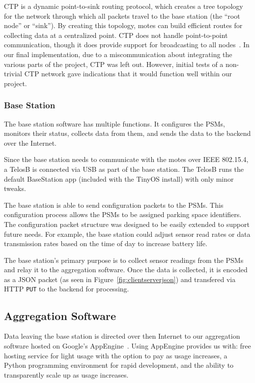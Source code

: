 \documentclass{acm_proc}
\begin{document}
CTP is a dynamic point-to-sink routing protocol, which creates a tree
topology for the network through which all packets travel to the base
station (the ``root node'' or ``sink'').
By creating this topology, motes can build efficient routes for collecting
data at a centralized point.
CTP does not handle point-to-point communication, though it does provide
support for broadcasting to all
nodes~\cite{tep123:collection-tree-protocol}.
In our final implementation, due to a miscommunication about integrating
the various parts of the project, CTP was left out.
However, initial tests of a non-trivial CTP network gave indications that
it would function well within our project.

\subsubsection{Base Station}

The base station software has multiple functions.
It configures the PSMs, monitors their status, collects data from them, and
sends the data to the backend over the Internet.

Since the base station needs to communicate with the motes over IEEE
802.15.4, a TelosB is connected via USB as part of the base station.
The TelosB runs the default BaseStation app (included with the TinyOS
install) with only minor tweaks.

The base station is able to send configuration packets to the PSMs.
This configuration process allows the PSMs to be assigned parking space
identifiers.
The configuration packet structure was designed to be easily extended to
support future needs.
For example, the base station could adjust sensor read rates or data
transmission rates based on the time of day to increase battery life.

The base station's primary purpose is to collect sensor readings from the
PSMs and relay it to the aggregation software.
Once the data is collected, it is encoded as a JSON packet (as seen in
Figure~\ref{fig:clientserverjson}) and transfered via HTTP \texttt{PUT} to
the backend for processing.

\subsection{Aggregation Software}

Data leaving the base station is directed over then Internet to our
aggregation software hosted on Google's AppEngine~\cite{google:appengine}.
Using AppEngine provides us with: free hosting service for light usage
with the option to pay as usage increases, a Python programming environment
for rapid development, and the ability to transparently scale up as usage
increases.
\end{document}
